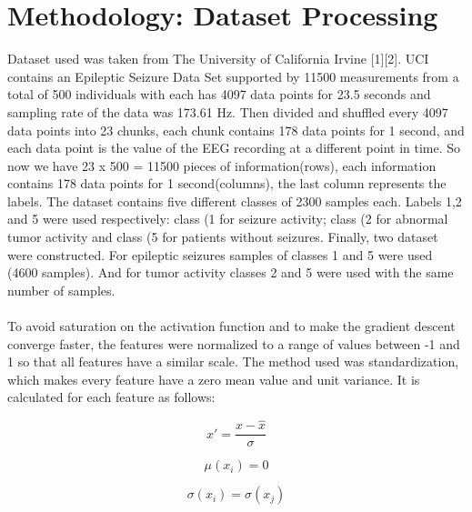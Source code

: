 \documentclass{llncs}       %
\begin{document}
\section{Methodology: Dataset Processing}
\label{sec:2}

Dataset used was taken from The University of California Irvine [1][2].  UCI contains an Epileptic Seizure Data Set supported by 11500 measurements from a total of 500 individuals with each has 4097 data points for 23.5 seconds and sampling rate of the data was 173.61 Hz. Then divided and shuffled every 4097 data points into 23 chunks, each chunk contains 178 data points for 1 second, and each data point is the value of the EEG recording at a different point in time. So now we have 23 x 500 = 11500 pieces of information(rows), each information contains 178 data points for 1 second(columns), the last column represents the labels.  The dataset contains five different classes of 2300 samples each. Labels 1,2 and 5 were used respectively: class (1 for seizure activity; class (2 for abnormal tumor activity and class (5 for patients without seizures.  Finally, two dataset were constructed.   For epileptic seizures samples of classes 1 and 5 were used (4600 samples).  And for tumor  activity classes 2 and 5 were used with the same number of samples.
   
\paragraph{}

To avoid saturation on the activation function and to make the gradient descent converge faster, the features were normalized to a range of values between -1 and 1 so that all features have a similar scale. The method used was standardization, which makes every feature have a zero mean value and unit variance. It is calculated for each feature as follows:


\begin{equation} 
x'=\frac{x-\hat{x}}{\sigma}
\end{equation}

\begin{equation}
\mu (x_{i})= 0   
\end{equation}

\begin{equation} 
\sigma (x_{i}) = \sigma(x_{j})
\end{equation}
\end{document}
